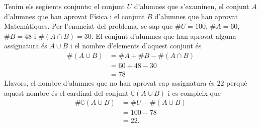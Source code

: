 \begin{solucio}
Tenim els següents conjunts: el conjunt $U$ d'alumnes que s'examinen, el
conjunt $A$ d'alumnes que han aprovat Física i el conjunt $B$ d'alumnes
que han aprovat Matemàtiques. Per l'enunciat del problema, se sap que $%
\#U=100$, $\#A=60$, $\#B=48$ i $\#(A\cap B)=30$. El conjunt d'alumnes que han
aprovat alguna assignatura és $A\cup B$ i el nombre d'elements d'aquest
conjunt és%
\begin{align*}
\#\left( A\cup B\right) & =\#A+\#B-\#\left( A\cap B\right) \\
& =60+48-30 \\
& =78
\end{align*}
Llavors, el nombre d'alumnes que no han aprovat cap assignatura és $22$
perquè aquest nombre és el cardinal del conjunt $\complement(A\cup B)
$ i es compleix que%
\begin{align*}
\#\complement(A\cup B) & =\#U-\#\left( A\cup B\right) \\
& =100-78 \\
& =22\text{.}
\end{align*}
\end{solucio}
